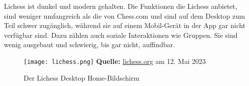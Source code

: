 Lichess ist dunkel und modern gehalten. Die Funktionen die Lichess anbietet, sind weniger umfangreich als die von Chess.com und sind auf dem Desktop zum Teil schwer zugänglich, während sie auf einem Mobil-Gerät in der App gar nicht verfügbar sind. Dazu zählen auch soziale Interaktionen wie Gruppen. Sie sind wenig ausgebaut und schwierig, bis gar nicht, auffindbar.

  \begin{figure}[htb]
  \centering
  \texttt{[image: lichess.png]}
\raggedleft
    \footnotesize\sffamily\textbf{Quelle:} \url{lichess.org} am 12. Mai 2023
  \caption{Der Lichess Desktop Home-Bildschirm}
  \label{fig:lichess}
\end{figure}